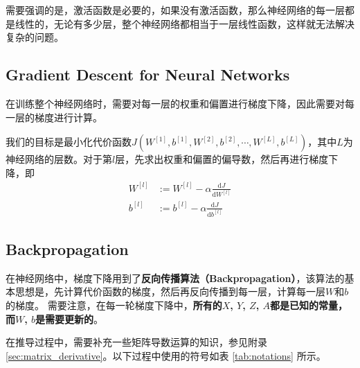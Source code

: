 需要强调的是，激活函数是必要的，如果没有激活函数，那么神经网络的每一层都是线性的，无论有多少层，整个神经网络都相当于一层线性函数，这样就无法解决复杂的问题。

\subsection{Gradient Descent for Neural Networks}
在训练整个神经网络时，需要对每一层的权重和偏置进行梯度下降，因此需要对每一层的梯度进行计算。

\vspace{0.5\baselineskip}
我们的目标是最小化代价函数$J(W^{[1]}, b^{[1]}, W^{[2]}, b^{[2]}, \cdots, W^{[L]}, b^{[L]})$，其中$L$为神经网络的层数。对于第$l$层，先求出权重和偏置的偏导数，然后再进行梯度下降，即
\begin{equation}
	\begin{aligned}
		W^{[l]} &:= W^{[l]} - \alpha \frac{\mathrm{d}J}{\mathrm{d}W^{[l]}} \\
		b^{[l]} &:= b^{[l]} - \alpha \frac{\mathrm{d}J}{\mathrm{d}b^{[l]}}
	\end{aligned}
\end{equation}

\subsection{Backpropagation}
在神经网络中，梯度下降用到了\textbf{反向传播算法（Backpropagation）}，该算法的基本思想是，先计算代价函数的梯度，然后再反向传播到每一层，计算每一层$W$和$b$的梯度。
需要注意，在每一轮梯度下降中，\textbf{所有的$X$, $Y$, $Z$, $A$都是已知的常量，而$W$, $b$是需要更新的}。

在推导过程中，需要补充一些矩阵导数运算的知识，参见附录 \ref{sec:matrix_derivative}。以下过程中使用的符号如表 \ref{tab:notations} 所示。

